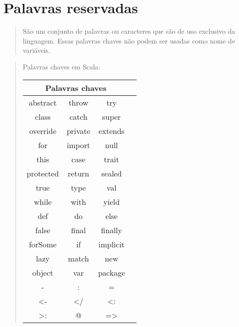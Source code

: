 \section{Palavras reservadas}
\begin{quote}
  São um conjunto de palavras ou caracteres que são de uso exclusivo da linguagem. Essas palavras chaves não podem ser usadas como nome de variáveis.
  \cite{Wampler2021}

\end{quote}
\begin{quote}
  \hspace{2.5mm} Palavras chaves em Scala:

  \begin{tabular}{ |c|c|c|c| }
    \hline
    \multicolumn{3}{|c|}{Palavras chaves} \\
    \hline
    abstract  & throw   & try             \\
    \hline
    class     & catch   & super           \\
    \hline
    override  & private & extends         \\
    \hline
    for       & import  & null            \\
    \hline
    this      & case    & trait           \\
    \hline
    protected & return  & sealed          \\
    \hline
    true      & type    & val             \\
    \hline
    while     & with    & yield           \\
    \hline
    def       & do      & else            \\
    \hline
    false     & final   & finally         \\
    \hline
    forSome   & if      & implicit        \\
    \hline
    lazy      & match   & new             \\
    \hline
    object    & var     & package         \\
    \hline
    -         & :       & =               \\
    \hline
    <-        & </      & <:              \\
    \hline
    \hline
    >:        & @       & =>              \\
    \hline
  \end{tabular}

\end{quote}
